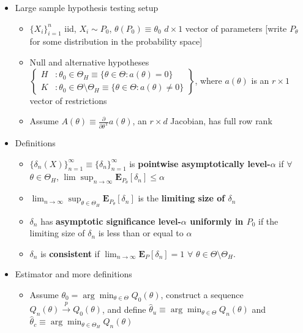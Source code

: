 \documentclass[12pt,english]{article}
\newcommand{\T}{\ensuremath{\text{T}}}
\begin{document}
\begin{itemize}
	\item Large sample hypothesis testing setup
	\begin{itemize}
		\item $\{ X_{i} \}_{i=1}^{n}$ iid, $X_{i} \sim P_{0}$, $\theta(P_{0}) \equiv \theta_{0}$ $d\times1$ vector of parameters [write $P_{\theta}$ for some distribution in the probability space]
		\item Null and alternative hypotheses $\left\{ \begin{array}{ll} H & : \theta_{0} \in \Theta_{H} \equiv \{ \theta \in \Theta : a(\theta) = 0 \} \\ K & : \theta_{0} \in \Theta \setminus \Theta_{H} \equiv \{ \theta \in \Theta : a(\theta) \neq 0 \} \end{array} \right\}$, where $a(\theta)$ is an $r\times1$ vector of restrictions
		\item Assume $A(\theta) \equiv \frac{\partial}{\partial \theta^{\T}} a(\theta)$, an $r\times d$ Jacobian, has full row rank
	\end{itemize}
	\item Definitions
	\begin{itemize}
		\item $\{ \delta_{n}(X) \}_{n=1}^{\infty} \equiv \{ \delta_{n} \}_{n=1}^{\infty}$ is \textbf{pointwise asymptotically level-$\alpha$} if $\forall$ $\theta \in \Theta_{H}$, $\lim \sup_{n \to \infty} \mathbf{E}_{P_{\theta}}[\delta_{n}] \leq \alpha$
		\item $\lim_{n \to \infty} \sup_{\theta \in \Theta_{H}} \mathbf{E}_{P_{\theta}}[\delta_{n}]$ is the \textbf{limiting size of $\delta_{n}$}
		\item $\delta_{n}$ has \textbf{asymptotic significance level-$\alpha$ uniformly in $P_{0}$} if the limiting size of $\delta_{n}$ is less than or equal to $\alpha$
		\item $\delta_{n}$ is \textbf{consistent} if $\lim_{n \to \infty} \mathbf{E}_{P}[\delta_{n}] = 1$ $\forall$ $\theta \in \Theta \setminus \Theta_{H}$.
	\end{itemize}
	\item Estimator and more definitions
	\begin{itemize}
		\item Assume $\theta_{0} = \arg \min_{\theta \in \Theta} Q_{0}(\theta)$, construct a sequence $Q_{n}(\theta) \overset{p}{\to} Q_{0}(\theta)$, and define $\hat{\theta}_{u} \equiv \arg \min_{\theta \in \Theta} Q_{n}(\theta)$ and $\hat{\theta}_{c} \equiv \arg \min_{\theta \in \Theta_{H}} Q_{n}(\theta)$

\end{itemize}
\end{itemize}
\end{document}
